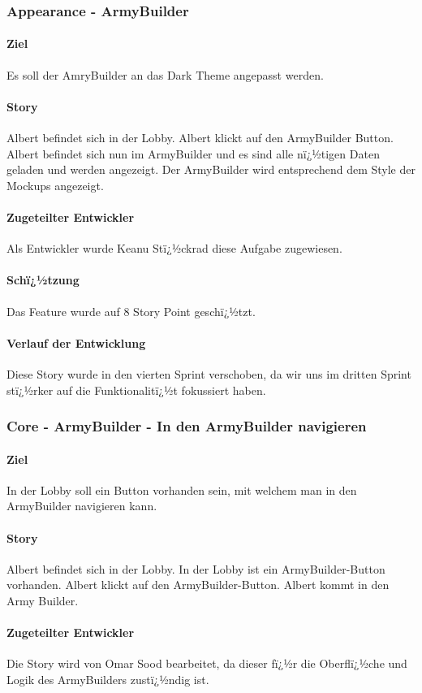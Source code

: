 \documentclass[12pt, titlepage]{scrartcl}
\begin{document}
		\subsubsection{Appearance - ArmyBuilder}
		\paragraph{Ziel} Es soll der AmryBuilder an das Dark Theme angepasst werden.
		\paragraph{Story} Albert befindet sich in der Lobby. Albert klickt auf den ArmyBuilder Button. Albert befindet sich nun im ArmyBuilder und es sind alle nï¿½tigen Daten geladen und werden angezeigt. Der ArmyBuilder wird entsprechend dem Style der Mockups angezeigt.
		\paragraph{Zugeteilter Entwickler} Als Entwickler wurde Keanu Stï¿½ckrad diese Aufgabe zugewiesen.
		\paragraph{Schï¿½tzung}
		Das Feature wurde auf 8 Story Point geschï¿½tzt.
		\paragraph{Verlauf der Entwicklung} 
		Diese Story wurde in den vierten Sprint verschoben, da wir uns im dritten Sprint stï¿½rker auf die Funktionalitï¿½t fokussiert haben. 
		
		\subsubsection{Core - ArmyBuilder - In den ArmyBuilder navigieren}
		\paragraph{Ziel} In der Lobby soll ein Button vorhanden sein, mit welchem man in den ArmyBuilder navigieren kann.
		\paragraph{Story} Albert befindet sich in der Lobby. In der Lobby ist ein ArmyBuilder-Button vorhanden. Albert klickt auf den ArmyBuilder-Button. Albert kommt in den Army Builder.
		\paragraph{Zugeteilter Entwickler} Die Story wird von Omar Sood bearbeitet, da dieser fï¿½r die Oberflï¿½che und Logik des ArmyBuilders zustï¿½ndig ist.
\end{document}
